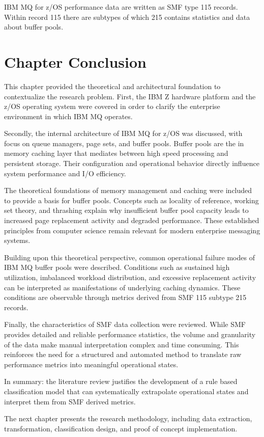 IBM MQ for z/OS performance data are written as SMF type 115 records. Within record 115 there are subtypes of which 215 contains statistics and data about buffer pools. \autocite{ibm2021_mq_bm_dr}


\section{Chapter Conclusion}%
\label{sec:soa-conclusion}

This chapter provided the theoretical and architectural foundation to contextualize the research problem. First, the IBM Z hardware platform and the z/OS operating system were covered in order to clarify the enterprise environment in which IBM MQ operates. 

Secondly, the internal architecture of IBM MQ for z/OS was discussed, with focus on queue managers, page sets, and buffer pools. Buffer pools are the in memory caching layer that mediates between high speed processing and persistent storage. Their configuration and operational behavior directly influence system performance and I/O efficiency.

The theoretical foundations of memory management and caching were included to provide a basis for buffer pools. Concepts such as locality of reference, working set theory, and thrashing explain why insufficient buffer pool capacity leads to increased page replacement activity and degraded performance. These established principles from computer science remain relevant for modern enterprise messaging systems.

Building upon this theoretical perspective, common operational failure modes of IBM MQ buffer pools were described. Conditions such as sustained high utilization, imbalanced workload distribution, and excessive replacement activity can be interpreted as manifestations of underlying caching dynamics. These conditions are observable through metrics derived from SMF 115 subtype 215 records.

Finally, the characteristics of SMF data collection were reviewed. While SMF provides detailed and reliable performance statistics, the volume and granularity of the data make manual interpretation complex and time consuming. This reinforces the need for a structured and automated method to translate raw performance metrics into meaningful operational states.

In summary: the literature review justifies the development of a rule based classification model that can systematically extrapolate operational states and interpret them from SMF derived metrics. 

The next chapter presents the research methodology, including data extraction, transformation, classification design, and proof of concept implementation.